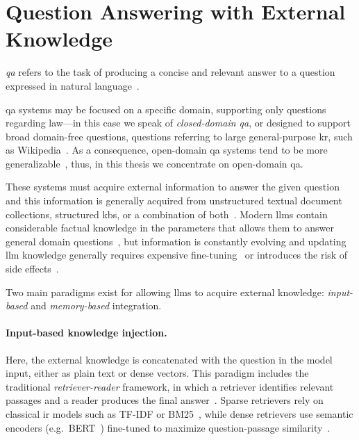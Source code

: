 \section{Question Answering with External Knowledge}
\label{sec:sota:qa}

\begin{definition}
    \emph{\Acf{qa}} refers to the task of producing a concise and relevant answer to a question expressed in natural language~\cite{entityorientedsearch2018balog}.
\end{definition}
\Ac{qa} systems may be focused on a specific domain, \eg supporting only questions regarding law---in this case we speak of \emph{closed-domain \acl{qa}}, or designed to support broad domain-free questions, \eg questions referring to large general-purpose \ac{kr}, such as Wikipedia~\cite{zaib2022conversationalqasurvey}. As a consequence, open-domain \ac{qa} systems tend to be more generalizable~\cite{zaib2022conversationalqasurvey}, thus, in this thesis we concentrate on open-domain \ac{qa}.

These systems must acquire external information to answer the given question and this information is generally acquired from unstructured textual document collections, structured \aclp{kb}, or a combination of both~\cite{caballero2021brief}. Modern \acp{llm} contain considerable factual knowledge in the parameters that allows them to answer general domain questions~\cite{chang_how_do_llm_acquire_factual_knowledge_2024,physics_of_lm_3.1_2024,petroni-etal-2019-language-models-kbs,roberts-etal-2020-how-much-kg-in-llm}, but information is constantly evolving and updating \ac{llm} knowledge generally requires expensive fine-tuning~\cite{kg_editing_survey_2024} or introduces the risk of side effects~\cite{li2024unveiling,cohen-etal-2024-rippleeffects}.


Two main paradigms exist for allowing \acp{llm} to acquire external knowledge: \emph{input-based} and \emph{memory-based} integration.

\paragraph{Input-based knowledge injection.}
Here, the external knowledge is concatenated with the question in the model input, either as plain text or dense vectors. This paradigm includes the traditional \emph{retriever-reader} framework, in which a retriever identifies relevant passages and a reader produces the final answer~\cite{zhu2021retrievingreadingcomprehensivesurvey}. Sparse retrievers rely on classical \ac{ir} models such as TF-IDF or BM25~\cite{jm3}, while dense retrievers use semantic encoders (e.g.\ BERT~\cite{devlin-etal-2019-bert}) fine-tuned to maximize question-passage similarity~\cite{karpukhin-etal-2020-dense}.


